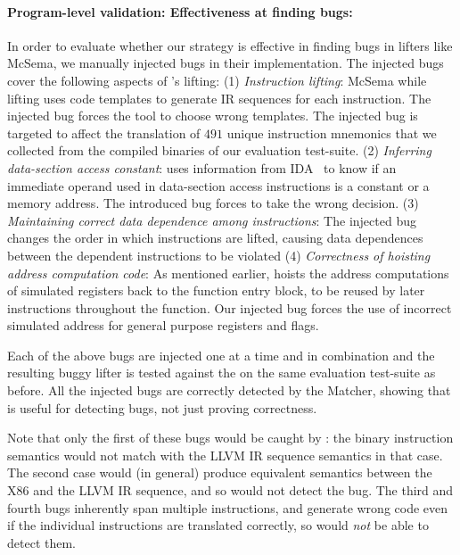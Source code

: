 \paragraph{Program-level validation: Effectiveness at finding bugs:}
%
In order to evaluate whether our strategy is effective in finding bugs in lifters like 
McSema, we manually injected bugs in their implementation. The injected bugs 
cover the following aspects of \mcsema's lifting: (1) \emph{Instruction 
lifting}: McSema 
while lifting uses code templates to generate IR sequences for each instruction. 
The injected bug forces the tool to choose wrong templates. The injected bug is 
targeted to affect the translation of $491$ unique instruction mnemonics that 
we collected from the compiled binaries of our evaluation test-suite.   
%
(2) \emph{Inferring data-section access constant}: \mcsema uses information from 
IDA~\cite{IDA} to know if an immediate operand used in data-section access 
instructions is a constant or a memory address. The introduced bug forces 
\mcsema to take the wrong decision.
%
(3) \emph{Maintaining 
correct data dependence among instructions}: The injected bug changes the 
order in which instructions are lifted, causing
data dependences between the dependent instructions to be violated
%
(4) \emph{Correctness of hoisting address computation code}: 
As mentioned earlier, 
\mcsema hoists the address computations of simulated registers back to the function
entry block, to be reused by 
later instructions throughout the function. Our injected bug forces 
the use of incorrect simulated address for general purpose registers and flags.

Each of the above bugs are injected one at a time and in combination and the 
resulting buggy lifter is tested against the \compd on the same evaluation 
test-suite as before. All the injected bugs are correctly detected by the Matcher,
showing that \plv is useful for detecting bugs, not just proving correctness.

Note that only the first of these bugs would be caught by \siv: the binary instruction
semantics would not match with the LLVM IR sequence semantics in that case.
The second case would (in general) produce equivalent semantics between the X86 and
the LLVM IR sequence, and so \siv would not detect the bug.
The third and fourth bugs inherently span multiple instructions, and generate 
wrong code even if the individual instructions are translated correctly, so \siv 
would \emph{not} be able to detect them.
